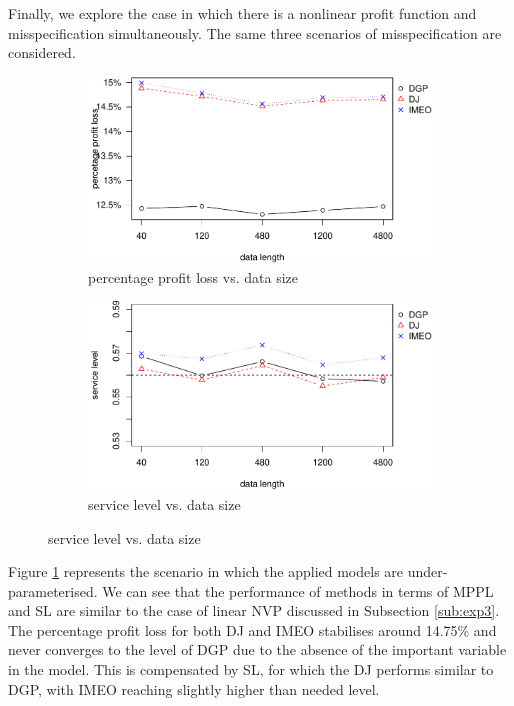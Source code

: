 \documentclass[a4paper,11pt]{article}
\begin{document}
Finally, we explore the case in which there is a nonlinear profit function and misspecification simultaneously. The same three scenarios of misspecification are considered.

\begin{figure}[ht]
\centering
\caption{Performance vs. sample size with under-parameterised nonlinear model}
\begin{subfigure}[b]{0.48\textwidth}
\centering
\includegraphics[width=\textwidth]{nonAR(1)ppl.pdf}
\caption{percentage profit loss vs. data size}
\end{subfigure}
\hfill
\begin{subfigure}[b]{0.48\textwidth}
\centering
\includegraphics[width=\textwidth]{nonAR(1)sl.pdf}
\caption{service level vs. data size}
\end{subfigure}
\label{fig:misnon_under}
\end{figure}

Figure \ref{fig:misnon_under} represents the scenario in which the applied models are under-parameterised. We can see that the performance of methods in terms of MPPL and SL are similar to the case of linear NVP discussed in Subsection \ref{sub:exp3}. The percentage profit loss for both DJ and IMEO stabilises around 14.75\% and never converges to the level of DGP due to the absence of the important variable in the model. This is compensated by SL, for which the DJ performs similar to DGP, with IMEO reaching slightly higher than needed level.
\end{document}
